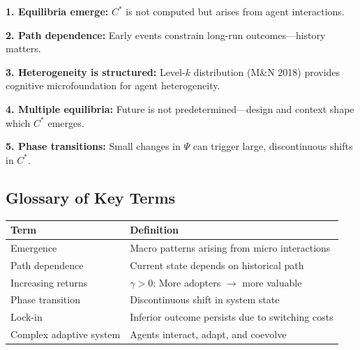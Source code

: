 \begin{tcolorbox}[colback=green!5!white, colframe=green!75!black,
    title=\textbf{Key Takeaways}]

\textbf{1. Equilibria emerge:} $C^*$ is not computed but arises from agent interactions.

\textbf{2. Path dependence:} Early events constrain long-run outcomes---history matters.

\textbf{3. Heterogeneity is structured:} Level-$k$ distribution (M\&N 2018) provides
cognitive microfoundation for agent heterogeneity.

\textbf{4. Multiple equilibria:} Future is not predetermined---design and context
shape which $C^*$ emerges.

\textbf{5. Phase transitions:} Small changes in $\Psi$ can trigger large,
discontinuous shifts in $C^*$.

\end{tcolorbox}

\subsection{Glossary of Key Terms}
\label{sec:ag-glossary}


\begin{center}
\renewcommand{\arraystretch}{1.3}
\begin{tabular}{@{}p{4cm}p{9cm}@{}}
\toprule
\textbf{Term} & \textbf{Definition} \\
\midrule
Emergence & Macro patterns arising from micro interactions \\
Path dependence & Current state depends on historical path \\
Increasing returns & $\gamma > 0$: More adopters $\to$ more valuable \\
Phase transition & Discontinuous shift in system state \\
Lock-in & Inferior outcome persists due to switching costs \\
Complex adaptive system & Agents interact, adapt, and coevolve \\
\bottomrule
\end{tabular}
\end{center}

